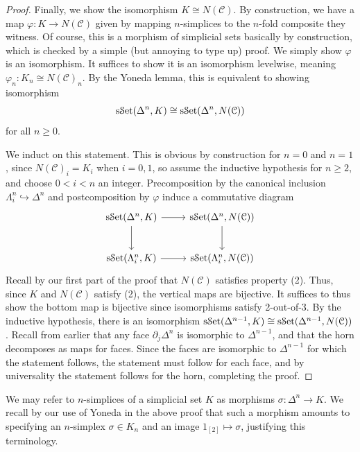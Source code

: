 \begin{proof}
Finally, we show the isomorphism $K\cong N(\mathcal{C} )$. By construction, we have a map $\varphi : K \to N(\mathcal{C} )$ given by mapping $n$-simplices to the $n$-fold composite they witness. Of course, this is a morphism of simplicial sets basically by construction, which is checked by a simple (but annoying to type up) proof. We simply show $\varphi $ is an isomorphism. It suffices to show it is an isomorphism levelwise, meaning $\varphi_n : K_n\cong N(\mathcal{C} )_n$. By the Yoneda lemma, this is equivalent to showing isomorphism
    \[
        \mathrm{s}\mathcal{S}\mathrm{et}(\Delta ^n,K)\cong \mathrm{s}\mathcal{S}\mathrm{et}(\Delta ^n,N(\mathcal{C} ))
    \]
    for all $n\geq 0$.

    We induct on this statement. This is obvious by construction for $n=0$ and $n=1$, since $N(\mathcal{C} )_i=K_i$ when $i=0,1$, so assume the inductive hypothesis for $n\geq 2$, and choose $0<i<n$ an integer. Precomposition by the canonical inclusion $\Lambda _i^n\hookrightarrow \Delta ^n$ and postcomposition by $\varphi $ induce a commutative diagram
    \[\begin{tikzcd}[row sep = 2.5em, column sep = 2.5em]
    \sSet(\Delta ^n,K)\ar[r] \ar[d]  & \sSet(\Delta ^n,N(\mathcal{C} ))\ar[d]  \\
    \sSet(\Lambda _i^n,K)\ar[r]  & \sSet(\Lambda _i^n,N(\mathcal{C} ))
    \end{tikzcd}\]
    Recall by our first part of the proof that $N(\mathcal{C} )$ satisfies property (2). Thus, since $K$ and $N(\mathcal{C} )$ satisfy (2), the vertical maps are bijective. It suffices to thus show the bottom map is bijective since isomorphisms satisfy 2-out-of-3. By the inductive hypothesis, there is an isomorphism $\mathrm{s}\mathcal{S}\mathrm{et}(\Delta ^{n-1} ,K)\cong \mathrm{s}\mathcal{S}\mathrm{et}(\Delta ^{n-1} ,N(\mathcal{C} ))$. Recall from earlier that any face $\partial _j\Delta ^n$ is isomorphic to $\Delta ^{n-1} $, and that the horn decomposes as maps for faces. Since the faces are isomorphic to $\Delta ^{n-1} $ for which the statement follows, the statement must follow for each face, and by universality the statement follows for the horn, completing the proof.
\end{proof}

\begin{remark}\label{1.1.2.6}
	We may refer to $n$-simplices of a simplicial set $K$ as morphisms $\sigma : \Delta^n\to K$. We recall by our use of Yoneda in the above proof that such a morphism amounts to specifying an $n$-simplex $\sigma\in K_n$ and an image $1_{[2]} \mapsto \sigma$, justifying this terminology.
\end{remark}


